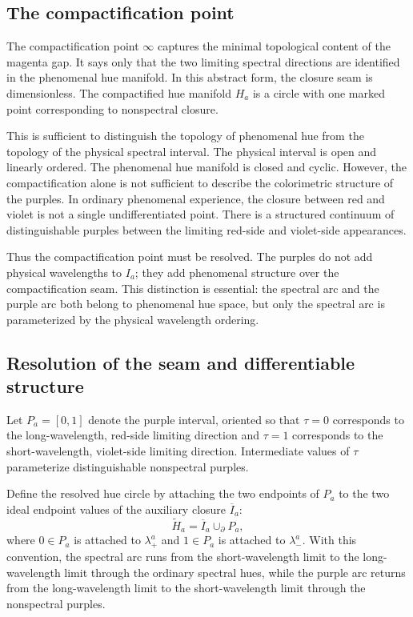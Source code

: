 \documentclass[preprint,12pt,authoryear]{elsarticle}
\theoremstyle{plain}
\theoremstyle{definition}
\theoremstyle{remark}
\begin{document}
\subsection{The compactification point}
\label{subsec:compactification-point}

\noindent The compactification point $\infty$ captures the minimal topological content of the magenta gap. It says only that the two limiting spectral directions are identified in the phenomenal hue manifold. In this abstract form, the closure seam is dimensionless. The compactified hue manifold $H_a$ is a circle with one marked point corresponding to nonspectral closure.

This is sufficient to distinguish the topology of phenomenal hue from the topology of the physical spectral interval. The physical interval is open and linearly ordered. The phenomenal hue manifold is closed and cyclic. However, the compactification alone is not sufficient to describe the colorimetric structure of the purples. In ordinary phenomenal experience, the closure between red and violet is not a single undifferentiated point. There is a structured continuum of distinguishable purples between the limiting red-side and violet-side appearances.

Thus the compactification point must be resolved. The purples do not add physical wavelengths to $I_a$; they add phenomenal structure over the compactification seam. This distinction is essential: the spectral arc and the purple arc both belong to phenomenal hue space, but only the spectral arc is parameterized by the physical wavelength ordering.

\subsection{Resolution of the seam and differentiable structure}
\label{subsec:resolution-of-seam}

\noindent Let $P_a=[0,1]$ denote the purple interval, oriented so that $\tau=0$ corresponds to the long-wavelength, red-side limiting direction and $\tau=1$ corresponds to the short-wavelength, violet-side limiting direction. Intermediate values of $\tau$ parameterize distinguishable nonspectral purples.

Define the resolved hue circle by attaching the two endpoints of $P_a$ to the two ideal endpoint values of the auxiliary closure $\overline I_a$:
\[
\widetilde H_a=\overline I_a\cup_{\partial}P_a,
\]
where $0\in P_a$ is attached to $\lambda_+^a$ and $1\in P_a$ is attached to $\lambda_-^a$. With this convention, the spectral arc runs from the short-wavelength limit to the long-wavelength limit through the ordinary spectral hues, while the purple arc returns from the long-wavelength limit to the short-wavelength limit through the nonspectral purples.
\end{document}
